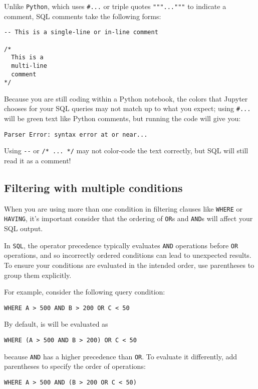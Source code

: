 \documentclass[
  letterpaper,
  DIV=11,
  numbers=noendperiod]{scrreprt}
\begin{document}
Unlike \texttt{Python}, which uses \texttt{\#...} or triple quotes
\texttt{"""..."""} to indicate a comment, SQL comments take the
following forms:

\begin{verbatim}
-- This is a single-line or in-line comment

/* 
  This is a 
  multi-line 
  comment 
*/
\end{verbatim}

Because you are still coding within a Python notebook, the colors that
Jupyter chooses for your SQL queries may not match up to what you
expect; using \texttt{\#...} will be green text like Python comments,
but running the code will give you:

\texttt{Parser\ Error:\ syntax\ error\ at\ or\ near...}

Using \texttt{-\/-} or \texttt{/*\ ...\ */} may not color-code the text
correctly, but SQL will still read it as a comment!

\subsection{Filtering with multiple
conditions}\label{filtering-with-multiple-conditions}

When you are using more than one condition in filtering clauses like
\texttt{WHERE} or \texttt{HAVING}, it's important consider that the
ordering of \texttt{OR}s and \texttt{AND}s will affect your SQL output.

In \texttt{SQL}, the operator precedence typically evaluates
\texttt{AND} operations before \texttt{OR} operations, and so
incorrectly ordered conditions can lead to unexpected results. To ensure
your conditions are evaluated in the intended order, use parentheses to
group them explicitly.

For example, consider the following query condition:

\texttt{WHERE\ A\ \textgreater{}\ 500\ AND\ B\ \textgreater{}\ 200\ OR\ C\ \textless{}\ 50}

By default, is will be evaluated as

\texttt{WHERE\ (A\ \textgreater{}\ 500\ AND\ B\ \textgreater{}\ 200)\ OR\ C\ \textless{}\ 50}

because \texttt{AND} has a higher precedence than \texttt{OR}. To
evaluate it differently, add parentheses to specify the order of
operations:

\texttt{WHERE\ A\ \textgreater{}\ 500\ AND\ (B\ \textgreater{}\ 200\ OR\ C\ \textless{}\ 50)}
\end{document}
